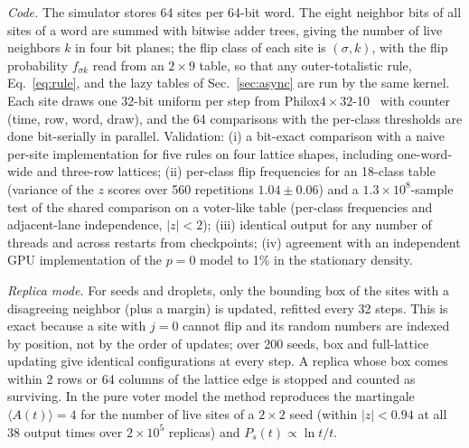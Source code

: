 \documentclass[pre,twocolumn,superscriptaddress,showpacs,floatfix]{revtex4-2}
\begin{document}
\textit{Code.} The simulator stores 64 sites per 64-bit word. The eight neighbor bits of all sites
of a word are summed with bitwise adder trees, giving the number of live neighbors $k$ in four
bit planes; the flip class of each site is $(\sigma, k)$, with the flip probability $f_{\sigma k}$
read from an $2\times 9$ table, so that any outer-totalistic rule, Eq.~\eqref{eq:rule}, and the lazy
tables of Sec.~\ref{sec:async} are run by the same kernel. Each site draws one 32-bit uniform per
step from Philox$4\times32$-10~\cite{salmon2011} with counter (time, row, word, draw), and the 64
comparisons with the per-class thresholds are done bit-serially in parallel. Validation: (i) a
bit-exact comparison with a naive per-site implementation for five rules on four lattice shapes,
including one-word-wide and three-row lattices; (ii) per-class flip frequencies for an 18-class
table (variance of the $z$ scores over 560 repetitions $1.04\pm0.06$) and a $1.3\times10^8$-sample
test of the shared comparison on a voter-like table (per-class frequencies and adjacent-lane
independence, $|z|<2$); (iii) identical output for any number of threads and across restarts
from checkpoints; (iv) agreement with an independent GPU implementation of the $p = 0$ model to
1\% in the stationary density.

\textit{Replica mode.} For seeds and droplets, only the bounding box of the sites with a
disagreeing neighbor (plus a margin) is updated, refitted every 32 steps. This is exact because a
site with $j = 0$ cannot flip and its random numbers are indexed by position, not by the order
of updates; over 200 seeds, box and full-lattice updating give identical configurations at
every step. A replica whose box comes within 2 rows or 64 columns of the lattice edge is stopped
and counted as surviving. In the pure voter model the method reproduces the martingale
$\langle A(t)\rangle = 4$ for the number of live sites of a $2\times2$ seed (within $|z|<0.94$
at all 38 output times over $2\times10^5$ replicas) and $P_s(t)\propto\ln t/t$.
\end{document}
